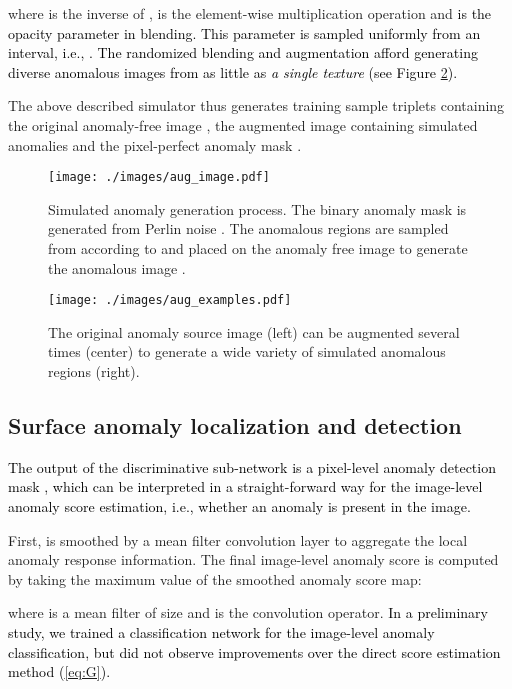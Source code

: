 \documentclass[10pt,twocolumn,letterpaper]{article}
\newcommand\ntext[1]{\textcolor{black}{#1}}
\begin{document}
where  is the inverse of ,  is the element-wise multiplication operation and \ntext{ is the opacity parameter in blending. This parameter is sampled uniformly from an interval, i.e., . The randomized blending and augmentation afford generating diverse anomalous images from as little as \textit{a single texture} (see Figure \ref{fig:aug_examples}).}












The above described simulator thus generates training sample triplets containing the original anomaly-free image , the augmented image containing simulated anomalies  and the pixel-perfect anomaly mask . 



\begin{figure}[!htb]
\centering
  \texttt{[image: ./images/aug\_image.pdf]}
\caption{Simulated anomaly generation process. The binary anomaly mask  is generated from Perlin noise . The anomalous regions are sampled from  according to  and placed on the anomaly free image  to generate the anomalous image .}
\label{fig:aug}
\end{figure}


\begin{figure}
\centering
  \texttt{[image: ./images/aug\_examples.pdf]}
\caption{The original anomaly source image (left) can be augmented several times (center) to generate a wide variety of simulated anomalous regions (right).}
\label{fig:aug_examples}
\end{figure}



\subsection{Surface anomaly localization and detection}
\ntext{The output of the discriminative sub-network is a pixel-level anomaly detection mask , which can be interpreted in a straight-forward way for the image-level anomaly score estimation, i.e., whether an anomaly is present in the image.}


First,  is smoothed by a mean filter convolution layer to aggregate the local anomaly response information. The final image-level anomaly score  is computed by taking the maximum value of the smoothed anomaly score map:

where  is a mean filter of size  and  is the convolution operator. \ntext{In a preliminary study, we trained a classification network for the image-level anomaly classification, but did not observe improvements over the direct score estimation method (\ref{eq:G}).}
\end{document}
